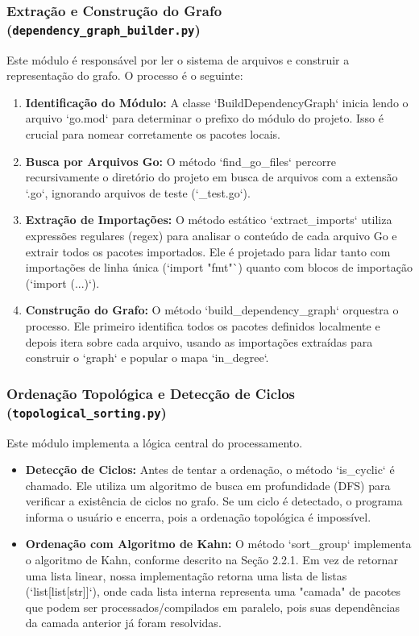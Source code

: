 \documentclass[12pt]{article}
\begin{document}
\subsubsection{Extração e Construção do Grafo (\texttt{dependency\_graph\_builder.py})}
Este módulo é responsável por ler o sistema de arquivos e construir a representação do grafo. O processo é o seguinte:
\begin{enumerate}
    \item \textbf{Identificação do Módulo:} A classe `BuildDependencyGraph` inicia lendo o arquivo `go.mod` para determinar o prefixo do módulo do projeto. Isso é crucial para nomear corretamente os pacotes locais.
    \item \textbf{Busca por Arquivos Go:} O método `find\_go\_files` percorre recursivamente o diretório do projeto em
        busca de arquivos com a extensão `.go`, ignorando arquivos de teste (`\_test.go`).
    \item \textbf{Extração de Importações:} O método estático `extract\_imports` utiliza expressões regulares (regex) para analisar o conteúdo de cada arquivo Go e extrair todos os pacotes importados. Ele é projetado para lidar tanto com importações de linha única (`import "fmt"`) quanto com blocos de importação (`import (...)`).
    \item \textbf{Construção do Grafo:} O método `build\_dependency\_graph` orquestra o processo. Ele primeiro
        identifica todos os pacotes definidos localmente e depois itera sobre cada arquivo, usando as importações
        extraídas para construir o `graph` e popular o mapa `in\_degree`.
\end{enumerate}

\subsubsection{Ordenação Topológica e Detecção de Ciclos (\texttt{topological\_sorting.py})}
Este módulo implementa a lógica central do processamento.
\begin{itemize}
    \item \textbf{Detecção de Ciclos:} Antes de tentar a ordenação, o método `is\_cyclic` é chamado. Ele utiliza um algoritmo de busca em profundidade (DFS) para verificar a existência de ciclos no grafo. Se um ciclo é detectado, o programa informa o usuário e encerra, pois a ordenação topológica é impossível.
    \item \textbf{Ordenação com Algoritmo de Kahn:} O método `sort\_group` implementa o algoritmo de Kahn, conforme descrito na Seção 2.2.1. Em vez de retornar uma lista linear, nossa implementação retorna uma lista de listas (`list[list[str]]`), onde cada lista interna representa uma "camada" de pacotes que podem ser processados/compilados em paralelo, pois suas dependências da camada anterior já foram resolvidas.
\end{itemize}
\end{document}
